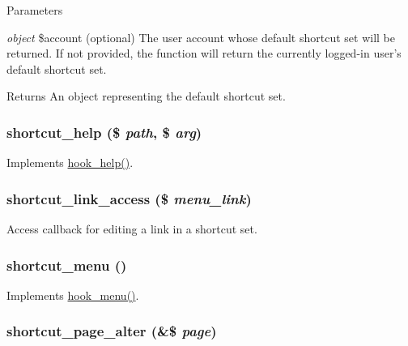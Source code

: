 \begin{DoxyParams}{Parameters}
\item[{\em object}]\$account (optional) The user account whose default shortcut set will be returned. If not provided, the function will return the currently logged-\/in user's default shortcut set.\end{DoxyParams}
\begin{DoxyReturn}{Returns}
An object representing the default shortcut set. 
\end{DoxyReturn}
\hypertarget{shortcut_8module_a6b261d9f27118738cecab12845de1204}{
\subsubsection[{shortcut\_\-help}]{\setlength{\rightskip}{0pt plus 5cm}shortcut\_\-help (\$ {\em path}, \/  \$ {\em arg})}}
\label{shortcut_8module_a6b261d9f27118738cecab12845de1204}
Implements \hyperlink{group__hooks_ga5589c2714a782738e8851c4c90231f0e}{hook\_\-help()}. \hypertarget{shortcut_8module_a336d6055c57e3183f8ea8af041aac190}{
\subsubsection[{shortcut\_\-link\_\-access}]{\setlength{\rightskip}{0pt plus 5cm}shortcut\_\-link\_\-access (\$ {\em menu\_\-link})}}
\label{shortcut_8module_a336d6055c57e3183f8ea8af041aac190}
Access callback for editing a link in a shortcut set. \hypertarget{shortcut_8module_a5dfac8f104b6ca9318337da0b2c3ac90}{
\subsubsection[{shortcut\_\-menu}]{\setlength{\rightskip}{0pt plus 5cm}shortcut\_\-menu ()}}
\label{shortcut_8module_a5dfac8f104b6ca9318337da0b2c3ac90}
Implements \hyperlink{group__hooks_ga5c95244fea59b25666e409759e133ded}{hook\_\-menu()}. \hypertarget{shortcut_8module_aed1e5026d91d1e85d44b433c09dae17e}{
\subsubsection[{shortcut\_\-page\_\-alter}]{\setlength{\rightskip}{0pt plus 5cm}shortcut\_\-page\_\-alter (\&\$ {\em page})}}
